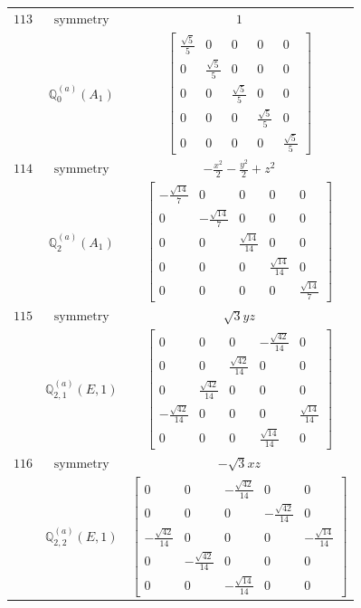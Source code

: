 \documentclass[fleqn,8pt,landscape]{jsarticle}
\begin{document}
\begin{longtable}{ccc}
$ 113 $ & $ \text{symmetry} $ & $ 1 $ \\
$  $ & $ \mathbb{Q}_{0}^{(a)}(A_{1}) $ & $ \begin{bmatrix} \frac{\sqrt{5}}{5} & 0 & 0 & 0 & 0 \\ 0 & \frac{\sqrt{5}}{5} & 0 & 0 & 0 \\ 0 & 0 & \frac{\sqrt{5}}{5} & 0 & 0 \\ 0 & 0 & 0 & \frac{\sqrt{5}}{5} & 0 \\ 0 & 0 & 0 & 0 & \frac{\sqrt{5}}{5} \end{bmatrix} $ \\ \hline
$ 114 $ & $ \text{symmetry} $ & $ - \frac{x^{2}}{2} - \frac{y^{2}}{2} + z^{2} $ \\
$  $ & $ \mathbb{Q}_{2}^{(a)}(A_{1}) $ & $ \begin{bmatrix} - \frac{\sqrt{14}}{7} & 0 & 0 & 0 & 0 \\ 0 & - \frac{\sqrt{14}}{7} & 0 & 0 & 0 \\ 0 & 0 & \frac{\sqrt{14}}{14} & 0 & 0 \\ 0 & 0 & 0 & \frac{\sqrt{14}}{14} & 0 \\ 0 & 0 & 0 & 0 & \frac{\sqrt{14}}{7} \end{bmatrix} $ \\ \hline
$ 115 $ & $ \text{symmetry} $ & $ \sqrt{3} y z $ \\
$  $ & $ \mathbb{Q}_{2,1}^{(a)}(E,1) $ & $ \begin{bmatrix} 0 & 0 & 0 & - \frac{\sqrt{42}}{14} & 0 \\ 0 & 0 & \frac{\sqrt{42}}{14} & 0 & 0 \\ 0 & \frac{\sqrt{42}}{14} & 0 & 0 & 0 \\ - \frac{\sqrt{42}}{14} & 0 & 0 & 0 & \frac{\sqrt{14}}{14} \\ 0 & 0 & 0 & \frac{\sqrt{14}}{14} & 0 \end{bmatrix} $ \\ \hline
$ 116 $ & $ \text{symmetry} $ & $ - \sqrt{3} x z $ \\
$  $ & $ \mathbb{Q}_{2,2}^{(a)}(E,1) $ & $ \begin{bmatrix} 0 & 0 & - \frac{\sqrt{42}}{14} & 0 & 0 \\ 0 & 0 & 0 & - \frac{\sqrt{42}}{14} & 0 \\ - \frac{\sqrt{42}}{14} & 0 & 0 & 0 & - \frac{\sqrt{14}}{14} \\ 0 & - \frac{\sqrt{42}}{14} & 0 & 0 & 0 \\ 0 & 0 & - \frac{\sqrt{14}}{14} & 0 & 0 \end{bmatrix} $ \\ \hline

\end{longtable}
\end{document}
